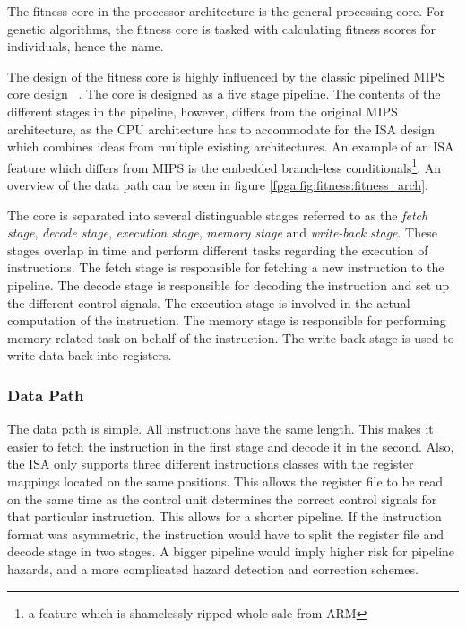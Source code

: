 The fitness core in the processor architecture is the general processing core.
For genetic algorithms, the fitness core is tasked with calculating fitness scores for individuals, hence the name.

The design of the fitness core is highly influenced by the classic pipelined \gls{MIPS} core design ~\cite[p.~362]{compOrgDes}.
The core is designed as a five stage pipeline.
The contents of the different stages in the pipeline, however, differs from the original \gls{MIPS} architecture, as the CPU architecture has to accommodate for the \gls{ISA} design which combines ideas from multiple existing architectures.
An example of an \gls{ISA} feature which differs from \gls{MIPS} is the embedded branch-less conditionals\footnote{a feature which is shamelessly ripped whole-sale from ARM}.
An overview of the data path can be seen in figure \vref{fpga:fig:fitness:fitness_arch}.




The core is separated into several distinguable stages referred to as the \emph{fetch stage}, \emph{decode stage}, \emph{execution stage}, \emph{memory stage} and \emph{write-back stage}. These stages overlap in time and perform different tasks regarding the execution of instructions. The fetch stage is responsible for fetching a new instruction to the pipeline. The decode stage is responsible for decoding the instruction and set up the different control signals. The execution stage is involved in the actual computation of the instruction. The memory stage is responsible for performing memory related task on behalf of the instruction. The write-back stage is used to write data back into registers.

 
\newpage
\subsubsection{Data Path} 

The data path is simple.
All instructions have the same length.
This makes it easier to fetch the instruction in the first stage and decode it in the second.
Also, the ISA only supports three different instructions classes with the register mappings located on the same positions.
This allows the register file to be read on the same time as the control unit determines the correct control signals for that particular instruction.
This allows for a shorter pipeline.
If the instruction format was asymmetric, the instruction would have to split the register file and decode stage in two stages.
A bigger pipeline would imply higher risk for pipeline hazards, and a more complicated hazard detection and correction schemes. 

